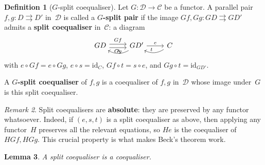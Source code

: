 \documentclass[a4paper,12pt]{book}
\newcommand{\id}{\mathrm{id}}
\theoremstyle{definition}
\newtheorem{definition}{Definition}[section]
\theoremstyle{plain}
\newtheorem{lemma}[definition]{Lemma}
\theoremstyle{remark}
\newtheorem{remark}[definition]{Remark}
\begin{document}
\begin{definition}[$G$-split coequaliser]\label{def:g-split-coeq}
Let $G\colon\mathcal{D}\to\mathcal{C}$ be a functor.
A parallel pair $f,g\colon D\rightrightarrows D'$ in~$\mathcal{D}$ is
called a \textbf{$G$-split pair} if the image
$Gf,Gg\colon GD\rightrightarrows GD'$ admits a \textbf{split coequaliser}
in~$\mathcal{C}$: a diagram
\[
\begin{tikzcd}
GD \arrow[r, shift left, "Gf"] \arrow[r, shift right, "Gg"'] &
GD' \arrow[r, "e"] \arrow[l, bend left=30, "s"'] &
C \arrow[l, bend left=30, "t"']
\end{tikzcd}
\]
with $e\circ Gf = e\circ Gg$, $e\circ s = \id_C$, $Gf\circ t = s\circ e$,
and $Gg\circ t = \id_{GD'}$.

A \textbf{$G$-split coequaliser} of $f,g$ is a coequaliser of $f,g$
in~$\mathcal{D}$ whose image under~$G$ is this split coequaliser.
\end{definition}

\begin{remark}\label{rem:split-coeq-absolute}
Split coequalisers are \textbf{absolute}: they are preserved by any
functor whatsoever.  Indeed, if $(e,s,t)$ is a split coequaliser as
above, then applying any functor~$H$ preserves all the relevant
equations, so $He$ is the coequaliser of $HGf,HGg$.  This crucial
property is what makes Beck's theorem work.
\end{remark}

\begin{lemma}\label{lem:split-coeq}
A split coequaliser is a coequaliser.
\end{lemma}
\end{document}
